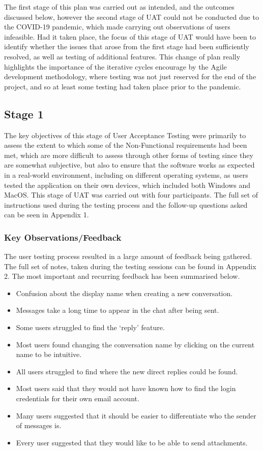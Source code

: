 The first stage of this plan was carried out as intended, and the outcomes discussed below, however the second stage of UAT could not be conducted due to the COVID-19 pandemic, which made carrying out observations of users infeasible. Had it taken place, the focus of this stage of UAT would have been to identify whether the issues that arose from the first stage had been sufficiently resolved, as well as testing of additional features. This change of plan really highlights the importance of the iterative cycles encourage by the Agile development methodology, where testing was not just reserved for the end of the project, and so at least some testing had taken place prior to the pandemic.

\subsection{Stage 1}\label{sec:stage1-uat}
The key objectives of this stage of User Acceptance Testing were primarily to assess the extent to which some of the Non-Functional requirements had been met, which are more difficult to assess through other forms of testing since they are somewhat subjective, but also to ensure that the software works as expected in a real-world environment, including on different operating systems, as users tested the application on their own devices, which included both Windows and MacOS. This stage of UAT was carried out with four participants. The full set of instructions used during the testing process and the follow-up questions asked can be seen in Appendix 1.

\subsubsection{Key Observations/Feedback}
The user testing process resulted in a large amount of feedback being gathered. The full set of notes, taken during the testing sessions can be found in Appendix 2. The most important and recurring feedback has been summarised below.

\begin{itemize}
  \item Confusion about the display name when creating a new conversation.
  \item Messages take a long time to appear in the chat after being sent.
  \item Some users struggled to find the `reply' feature.
  \item Most users found changing the conversation name by clicking on the current name to be intuitive.
  \item All users struggled to find where the new direct replies could be found.
  \item Most users said that they would not have known how to find the login credentials for their own email account.
  \item Many users suggested that it should be easier to differentiate who the sender of messages is.
  \item Every user suggested that they would like to be able to send attachments.
\end{itemize}

